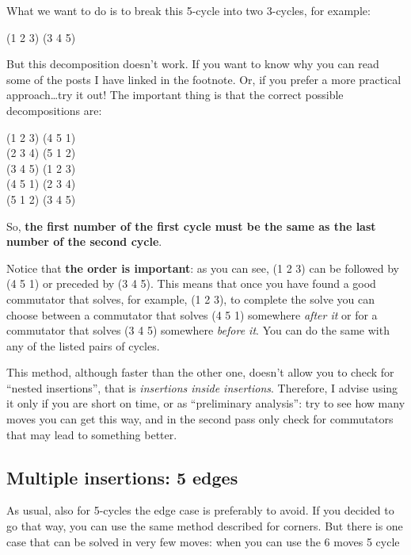 \documentclass[11pt,a4paper]{book}
\begin{document}
What we want to do is to break this 5-cycle into two 3-cycles, for example:

\begin{center}
(1 2 3) (3 4 5)
\end{center}

But this decomposition doesn't work. If you want to know why you can read some of the posts I have linked in the footnote. Or, if you prefer a more practical approach\dots try it out! The important thing is that the correct possible decompositions are:

\begin{center}
(1 2 3) (4 5 1)\\
(2 3 4) (5 1 2)\\
(3 4 5) (1 2 3)\\
(4 5 1) (2 3 4)\\
(5 1 2) (3 4 5)\\
\end{center}

So, \textbf{the first number of the first cycle must be the same as the last number of the second cycle}.

Notice that \textbf{the order is important}: as you can see, (1 2 3) can be followed by (4 5 1) or preceded by (3 4 5). This means that once you have found a good commutator that solves, for example, (1 2 3), to complete the solve you can choose between a commutator that solves (4 5 1) somewhere \emph{after it} or for a commutator that solves (3 4 5) somewhere \emph{before it}. You can do the same with any of the listed pairs of cycles.

This method, although faster than the other one, doesn't allow you to check for ``nested insertions'', that is \emph{insertions inside insertions}. Therefore, I advise using it only if you are short on time, or as ``preliminary analysis'': try to see how many moves you can get this way, and in the second pass only check for commutators that may lead to something better.

\subsection{Multiple insertions: 5 edges}
\label{sec:5e}

As usual, also for 5-cycles the edge case is preferably to avoid. If you decided to go that way, you can use the same method described for corners.
But there is one case that can be solved in very few moves: when you can use the 6 moves 5 cycle
\end{document}
